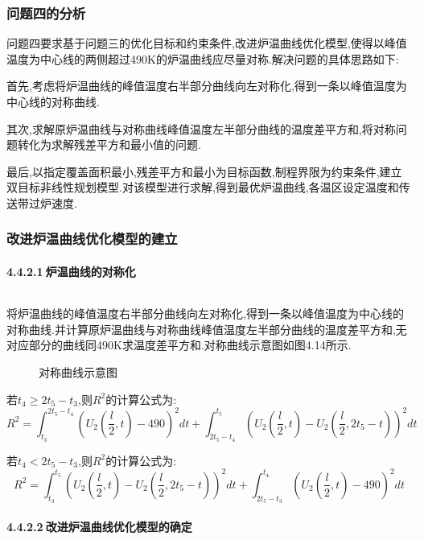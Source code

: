 \documentclass[12pt]{ctexart}
\numberwithin{figure}{section}
\numberwithin{table}{section}
\begin{document}
\subsubsection{问题四的分析}
问题四要求基于问题三的优化目标和约束条件,改进炉温曲线优化模型,使得以峰值温度为中心线的两侧超过490K的炉温曲线应尽量对称.解决问题的具体思路如下:

首先,考虑将炉温曲线的峰值温度右半部分曲线向左对称化,得到一条以峰值温度为中心线的对称曲线.

其次,求解原炉温曲线与对称曲线峰值温度左半部分曲线的温度差平方和,将对称问题转化为求解残差平方和最小值的问题.

最后,以指定覆盖面积最小,残差平方和最小为目标函数,制程界限为约束条件,建立双目标非线性规划模型.对该模型进行求解,得到最优炉温曲线,各温区设定温度和传送带过炉速度.
\subsubsection{改进炉温曲线优化模型的建立}
\paragraph{4.4.2.1$\ $炉温曲线的对称化}$\ $

将炉温曲线的峰值温度右半部分曲线向左对称化,得到一条以峰值温度为中心线的对称曲线.并计算原炉温曲线与对称曲线峰值温度左半部分曲线的温度差平方和,无对应部分的曲线同490K求温度差平方和.对称曲线示意图如图4.14所示.
\begin{figure}[!htp]
\centering
{}
\quad
{}
\caption{对称曲线示意图}
\end{figure}

若$t_4\geq2t_5-t_3$,则$R^2$的计算公式为:
\begin{equation}
   R^2=\int_{t_3}^{2t_5-t_4}(U_2(\frac{l}{2},t)-490)^2dt+\int_{2t_5-t_4}^{t_5}(U_2(\frac{l}{2},t)-U_2(\frac{l}{2},2t_5-t))^2dt
\end{equation}

若$t_4<2t_5-t_3$,则$R^2$的计算公式为:
\begin{equation}
   R^2=\int_{t_3}^{t_5}(U_2(\frac{l}{2},t)-U_2(\frac{l}{2},2t_5-t))^2dt+\int_{2t_5-t_3}^{t_4}(U_2(\frac{l}{2},t)-490)^2dt
\end{equation}

\paragraph{4.4.2.2$\ $改进炉温曲线优化模型的确定}$\ $
\end{document}
